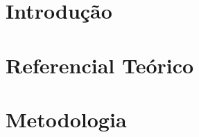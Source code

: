 \documentclass[
	12pt,				%
	openright,			%
	oneside,			%
	a4paper,			%
	chapter=TITLE,		%
	english,			%
	french,				%
	spanish,			%
	brazil				%
	]{abntex2}
\newif\ifisTipoDocumento
\begin{document}


\tableofcontents*
\cleardoublepage


\textual

\chapter[Introdução]{Introdução}



\chapter{Referencial Teórico}
\label{Cap02:Referencial_Teorico}



\ifisTipoDocumento
    \chapter[Metodologia e etapas de desenvolvimento]{Metodologia e etapas de desenvolvimento}
    
    
\else
    \chapter[Metodologia]{Metodologia}
    
\fi


\ifisTipoDocumento
\end{document}
